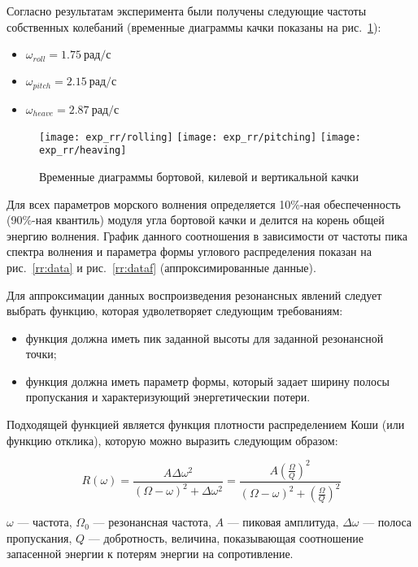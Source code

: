 Согласно результатам эксперимента были получены следующие частоты собственных колебаний (временные диаграммы качки показаны на рис.~\ref{exp_rr_rolling}):
\begin{itemize}
	\item	$ \omega_{roll} = 1.75\ \text{рад/с}$
	\item	$ \omega_{pitch} = 2.15\ \text{рад/с}$
	\item	$ \omega_{heave} = 2.87\ \text{рад/с}$
\end{itemize}

\begin{figure}[ht]
	\begin{center}
	\texttt{[image: exp\_rr/rolling]}
	\texttt{[image: exp\_rr/pitching]}
	\texttt{[image: exp\_rr/heaving]}
	\end{center}
	\caption{Временные диаграммы бортовой, килевой и вертикальной качки}
	\label{exp_rr_rolling}
\end{figure}

Для всех параметров морского волнения определяется 10\%-ная обеспеченность (90\%-ная квантиль) модуля угла бортовой качки и делится на корень общей энергию волнения. График данного соотношения в зависимости от частоты пика спектра волнения и параметра формы углового распределения показан на рис.~\ref{rr:data} и рис.~\ref{rr:dataf} (аппроксимированные данные).

Для аппроксимации данных воспроизведения резонансных явлений следует выбрать функцию, которая удволетворяет следующим требованиям: 
\begin{itemize}
	\item	функция должна иметь пик заданной высоты для заданной резонансной точки;
	\item	функция должна иметь параметр формы, который задает ширину полосы пропускания и характеризующий
			энергетическии потери.  
\end{itemize} 

Подходящей функцией является функция плотности распределением Коши (или функцию отклика), которую можно выразить следующим образом:

\begin{equation}
	R(\omega) = \frac{A \Delta \omega^2} {  (\Omega-\omega)^2 + \Delta \omega^2 } 
		 = \frac{A \left( \frac{\Omega}{Q} \right) ^2} {  (\Omega-\omega)^2 + \left( \frac{\Omega}{Q} \right) ^2 } 
\label{cauchy}
\end{equation}

$\omega$ --- частота, $\Omega_0$ --- резонансная частота, $A$ --- пиковая амплитуда, $\Delta \omega$ --- полоса пропускания, $Q$ --- добротность, величина, показывающая соотношение запасенной энергии к потерям энергии на сопротивление.

